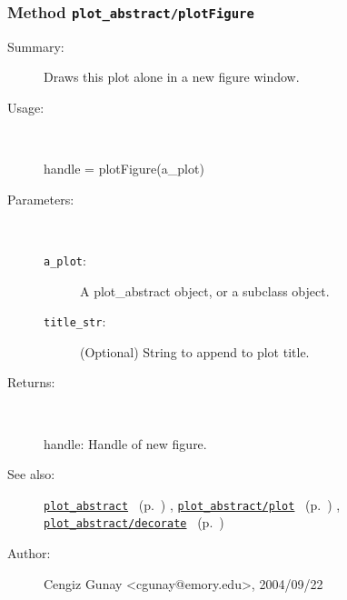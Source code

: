 \subsubsection[Method \texttt{plotFigure}]{Method \texttt{plot\_abstract/plotFigure}}%
%
\label{ref_plot_abstract__plotFigure}%
\hypertarget{ref_plot_abstract__plotFigure}{}%
\begin{description}
\item[Summary:]Draws this plot alone in a new figure window.
%
\item[Usage:]~%
\begin{lyxcode}%
handle = plotFigure(a\_plot)
%
\end{lyxcode}%
%
%
\item[Parameters:]~
\begin{description}%
\item[\texttt{a\_plot}:]
 A plot\_abstract object, or a subclass object.
\item[\texttt{title\_str}:]
 (Optional) String to append to plot title.
\end{description}%
%
\item[Returns:]~

	handle: Handle of new figure.
%
%
\item[See also:]%
\hyperlink{ref_plot_abstract}{\texttt{plot\_abstract}}%
\ (p.~\pageref{ref_plot_abstract})%
%
, \hyperlink{ref_plot_abstract__plot}{\texttt{plot\_abstract/plot}}%
\ (p.~\pageref{ref_plot_abstract__plot})%
%
, \hyperlink{ref_plot_abstract__decorate}{\texttt{plot\_abstract/decorate}}%
\ (p.~\pageref{ref_plot_abstract__decorate})%
%
%
\item[Author:]%
Cengiz Gunay <cgunay@emory.edu>, 2004/09/22%
\end{description}
\methodline%
